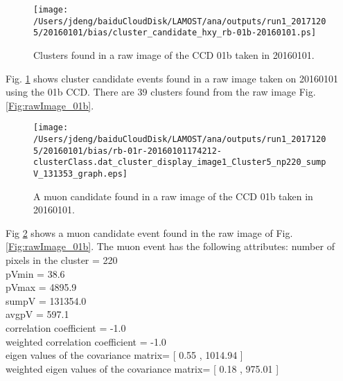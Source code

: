 \documentclass[12pt,twoside,letterpaper]{article}
\begin{document}
   \begin{figure}[!htbp]
   \begin{center}
       \texttt{[image: /Users/jdeng/baiduCloudDisk/LAMOST/ana/outputs/run1\_20171205/20160101/bias/cluster\_candidate\_hxy\_rb-01b-20160101.ps]}
       \caption{Clusters found in a raw image of the CCD 01b taken in 20160101.}
       \label{Fig:clusters_01b}
   \end{center}    
   \end{figure}

Fig. \ref{Fig:clusters_01b} shows cluster candidate events found in a raw image taken on 20160101 using the 01b CCD. There are 39 clusters found from the raw image Fig. \ref{Fig:rawImage_01b}.

   \begin{figure}[!htbp]
   \begin{center}
       \texttt{[image: /Users/jdeng/baiduCloudDisk/LAMOST/ana/outputs/run1\_20171205/20160101/bias/rb-01r-20160101174212-clusterClass.dat\_cluster\_display\_image1\_Cluster5\_np220\_sumpV\_131353\_graph.eps]}
       \caption{A muon candidate found in a raw image of the CCD 01b taken in 20160101.}
       \label{Fig:muon_np220_01b}
   \end{center}    
   \end{figure}

Fig \ref{Fig:muon_np220_01b} shows a muon candidate event found in the raw image of Fig. \ref{Fig:rawImage_01b}. The muon event has the following attributes: 
number of pixels in the cluster =  220 \\
pVmin =  38.6\\
pVmax =  4895.9\\
sumpV =  131354.0\\
avgpV =  597.1\\
correlation coefficient          =  -1.0\\
weighted correlation coefficient =  -1.0\\
eigen values of the covariance matrix=          [  0.55 ,  1014.94 ]\\
weighted eigen values of the covariance matrix= [  0.18 ,  975.01 ]\\
\end{document}
